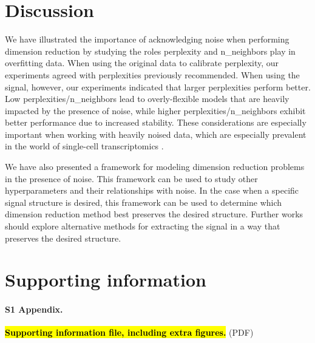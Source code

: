 \documentclass[10pt,letterpaper]{article}
\begin{document}
\section*{Discussion}
We have illustrated the importance of acknowledging noise when performing dimension reduction by studying the roles perplexity and n\_neighbors play in overfitting data. When using the original data to calibrate perplexity, our experiments agreed with perplexities previously recommended. When using the signal, however, our experiments indicated that larger perplexities perform better. Low perplexities/n\_neighbors lead to overly-flexible models that are heavily impacted by the presence of noise, while higher perplexities/n\_neighbors exhibit better performance due to increased stability. These considerations are especially important when working with heavily noised data, which are especially prevalent in the world of single-cell transcriptomics \cite{noise in single-cell data}.

We have also presented a framework for modeling dimension reduction problems in the presence of noise. This framework can be used to study other hyperparameters and their relationships with noise. In the case when a specific signal structure is desired, this framework can be used to determine which dimension reduction method best preserves the desired structure. Further works should explore alternative methods for extracting the signal in a way that preserves the desired structure.

\section*{Supporting information}

\paragraph*{S1 Appendix.}
\label{S1}
{{\bf \hl{Supporting information file, including extra figures.}} (PDF)}

\nolinenumbers
\end{document}
